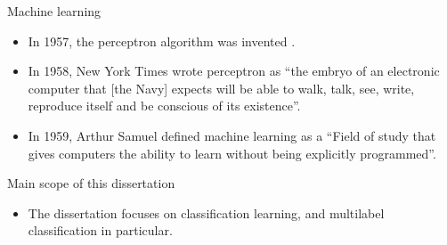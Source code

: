 \documentclass[first=purple,second=dgreen,logo=redexc]{aaltoslides}
\begin{document}
{\begin{frame}{Machine learning}
\begin{itemize}
\begin{center}
		\end{center}
		\item In 1957, the perceptron algorithm was invented \citep{Rosenblatt58}.
		\item In 1958, New York Times wrote perceptron as ``the embryo of an electronic computer that [the Navy] expects will be able to walk, talk, see, write, reproduce itself and be conscious of its existence''.
		\item In 1959, Arthur Samuel defined machine learning as a ``Field of study that gives computers the ability to learn without being explicitly programmed''.
	\end{itemize}
\end{frame}

\begin{frame}{Main scope of this dissertation}
	\begin{itemize}
		\item The dissertation focuses on classification learning, and multilabel classification in particular. 
	\end{itemize}
\end{frame}
	
}
\end{document}
